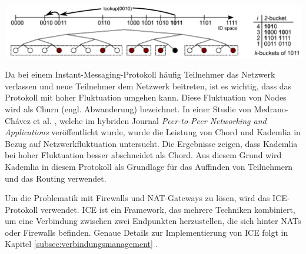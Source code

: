 \begin{center}
    \captionsetup{type=figure}
    \includegraphics[width=0.9\linewidth]{images/kademlia_tree.png}
    \label{kademlia_tree}
\end{center}


\noindent Da bei einem Instant-Messaging-Protokoll häufig Teilnehmer das Netzwerk verlassen und neue Teilnehmer dem Netzwerk beitreten, ist es wichtig, dass das Protokoll mit hoher Fluktuation umgehen kann. Diese Fluktuation von Nodes wird als Churn (engl. Abwanderung) bezeichnet. In einer Studie von Medrano-Chávez et al. \parencite{MedranoChavez_ChordKademliaHighChurnScenarios}, welche im hybriden Journal \textit{Peer-to-Peer Networking and Applications} veröffentlicht wurde, wurde die Leistung von Chord und Kademlia in Bezug auf Netzwerkfluktuation untersucht. Die Ergebnisse zeigen, dass Kademlia bei hoher Fluktuation besser abschneidet als Chord. Aus diesem Grund wird Kademlia in diesem Protokoll als Grundlage für das Auffinden von Teilnehmern und das Routing verwendet.

Um die Problematik mit Firewalls und NAT-Gateways zu lösen, wird das ICE-Protokoll verwendet. ICE ist ein Framework, das mehrere Techniken kombiniert, um eine Verbindung zwischen zwei Endpunkten herzustellen, die sich hinter NATs oder Firewalls befinden. Genaue Details zur Implementierung von ICE folgt in Kapitel \ref{subsec:verbindungsmanagement} \textit{}.


